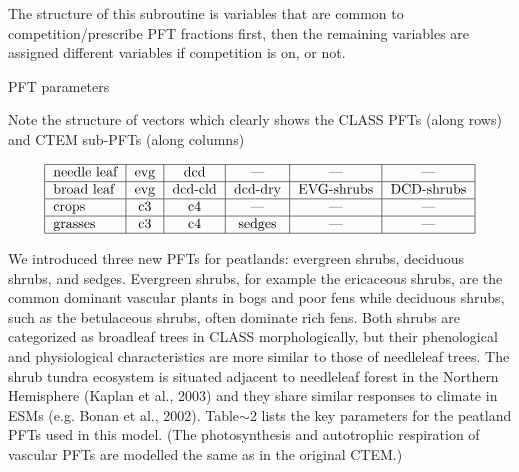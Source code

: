 The structure of this subroutine is variables that are common to competition/prescribe P\+F\+T fractions first, then the remaining variables are assigned different variables if competition is on, or not.

P\+F\+T parameters

Note the structure of vectors which clearly shows the C\+L\+A\+S\+S P\+F\+Ts (along rows) and C\+T\+E\+M sub-\/\+P\+F\+Ts (along columns)

\[ \begin{tabular} { | l | c | c | c | c | c | } \hline needle leaf & evg & dcd & --- & ---& ---\\ \hline broad leaf & evg & dcd-cld & dcd-dry & EVG-shrubs & DCD-shrubs\\ \hline crops & c3 & c4 & --- & ---& ---\\ \hline grasses & c3 & c4 & sedges & ---& ---\\ \hline \end{tabular} \]

We introduced three new P\+F\+Ts for peatlands\+: evergreen shrubs, deciduous shrubs, and sedges. Evergreen shrubs, for example the ericaceous shrubs, are the common dominant vascular plants in bogs and poor fens while deciduous shrubs, such as the betulaceous shrubs, often dominate rich fens. Both shrubs are categorized as broadleaf trees in C\+L\+A\+S\+S morphologically, but their phenological and physiological characteristics are more similar to those of needleleaf trees. The shrub tundra ecosystem is situated adjacent to needleleaf forest in the Northern Hemisphere (Kaplan et al., 2003) and they share similar responses to climate in E\+S\+Ms (e.\+g. Bonan et al., 2002). Table$\sim$2 lists the key parameters for the peatland P\+F\+Ts used in this model. (The photosynthesis and autotrophic respiration of vascular P\+F\+Ts are modelled the same as in the original C\+T\+E\+M.) 